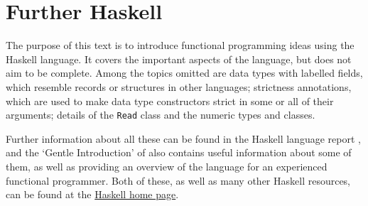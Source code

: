 \section*{Further Haskell}

The purpose of this text is to introduce functional programming ideas using the
Haskell language. It covers the important aspects of the language, but does not
aim to be complete. Among the topics omitted are data types with labelled fields, which resemble
records or structures in other languages; strictness annotations, 
which are used to make data type constructors strict in some or all of their arguments; 
details of the \texttt{Read} class and the numeric types and classes. 

Further information about all these
can be found in the Haskell language report  \cite{haskell2010}, and the
`Gentle Introduction' of \cite{gentle98} also contains useful
information about some of them, as well as providing an
overview of the language for an experienced functional programmer. Both
of these, as well as many other Haskell resources, can be found at the
\href{https://www.haskell.org/}{Haskell home page}.

